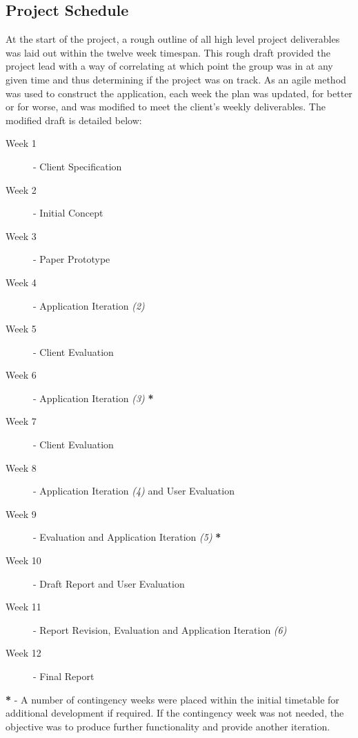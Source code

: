 \subsection{Project Schedule}
At the start of the project, a rough outline of all high level project deliverables was laid out within the twelve week timespan. This rough draft provided the project lead with a way of correlating at which point the group was in at any given time and thus determining if the project was on track. As an agile method was used to construct the application, each week the plan was updated, for better or for worse, and was modified to meet the client's weekly deliverables. The modified draft is detailed below:

\begin{description}
	\item[Week 1] - Client Specification
	\item[Week 2] - Initial Concept
	\item[Week 3] - Paper Prototype
	\item[Week 4] - Application Iteration \textit{(2)}
	\item[Week 5] - Client Evaluation
	\item[Week 6] - Application Iteration \textit{(3)} \textbf{*}
	\item[Week 7] - Client Evaluation
	\item[Week 8] - Application Iteration \textit{(4)} and User Evaluation
	\item[Week 9] - Evaluation and Application Iteration \textit{(5)} \textbf{*}
	\item[Week 10] - Draft Report and User Evaluation
	\item[Week 11] - Report Revision, Evaluation and Application Iteration \textit{(6)}
	\item[Week 12] - Final Report
\end{description}

\textbf{*} - A number of contingency weeks were placed within the initial timetable for additional development if required. If the contingency week was not needed, the objective was to produce further functionality and provide another iteration.

